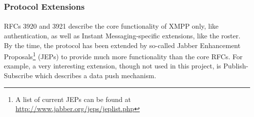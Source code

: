 \subsubsection{Protocol Extensions}
\paragraph{}
RFCs 3920 and 3921 describe the core functionality of XMPP only, like authentication, as well as Instant Messaging-specific extensions, like the roster. By the time, the protocol has been extended by so-called Jabber Enhancement Proposals\footnote{A list of current JEPs can be found at \href{http://www.jabber.org/jeps/jeplist.php}{http://www.jabber.org/jeps/jeplist.php}} (JEPs) to provide much more functionality than the core RFCs. For example, a very interesting extension, though not used in this project, is Publish-Subscribe \cite{jep0060} which describes a data push mechanism.
